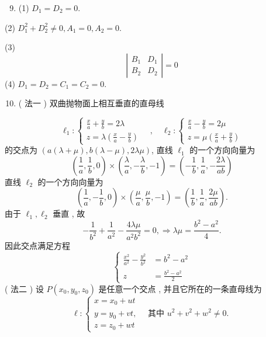 \documentclass[10pt]{article}
\begin{document}
\begin{enumerate}
  \setcounter{enumi}{8}
  \item (1) $D_{1}=D_{2}=0$.
\end{enumerate}
(2) $D_{1}^{2}+D_{2}^{2} \neq 0, A_{1}=0, A_{2}=0$.

(3)
$$
\left|\begin{array}{cc}
B_{1} & D_{1} \\
B_{2} & D_{2}
\end{array}\right|=0
$$
(4) $D_{1}=D_{2}=C_{1}=C_{2}=0$.

\begin{enumerate}
  \setcounter{enumi}{9}
  \item ( 法一 )  双曲抛物面上相互垂直的直母线 
\end{enumerate}
$$
\ell_{1}:\left\{\begin{array}{l}
\frac{x}{a}+\frac{y}{b}=2 \lambda \\
z=\lambda\left(\frac{x}{a}-\frac{y}{b}\right)
\end{array} \quad, \quad \ell_{2}:\left\{\begin{array}{l}
\frac{x}{a}-\frac{y}{b}=2 \mu \\
z=\mu\left(\frac{x}{a}+\frac{y}{b}\right)
\end{array}\right.\right.
$$
 的交点为  $(a(\lambda+\mu), b(\lambda-\mu), 2 \lambda \mu)$,  直线  $\ell_{1}$  的一个方向向量为 
$$
\left(\frac{1}{a}, \frac{1}{b}, 0\right) \times\left(\frac{\lambda}{a},-\frac{\lambda}{b},-1\right)=\left(-\frac{1}{b}, \frac{1}{a},-\frac{2 \lambda}{a b}\right)
$$
 直线  $\ell_{2}$  的一个方向向量为 
$$
\left(\frac{1}{a},-\frac{1}{b}, 0\right) \times\left(\frac{\mu}{a}, \frac{\mu}{b},-1\right)=\left(\frac{1}{b}, \frac{1}{a}, \frac{2 \mu}{a b}\right) .
$$
 由于  $\ell_{1}, \ell_{2}$  垂直 ,  故 
$$
-\frac{1}{b^{2}}+\frac{1}{a^{2}}-\frac{4 \lambda \mu}{a^{2} b^{2}}=0, \Longrightarrow \lambda \mu=\frac{b^{2}-a^{2}}{4} .
$$
 因此交点满足方程 
$$
\left\{\begin{aligned}
\frac{x^{2}}{a^{2}}-\frac{y^{2}}{b^{2}} &=b^{2}-a^{2} \\
z &=\frac{b^{2}-a^{2}}{2}
\end{aligned}\right.
$$
( 法二 )  设  $P\left(x_{0}, y_{0}, z_{0}\right)$  是任意一个交点 ,  并且它所在的一条直母线为 
$$
\ell:\left\{\begin{array}{l}
x=x_{0}+u t \\
y=y_{0}+v t, \quad \text { 其中 } u^{2}+v^{2}+w^{2} \neq 0 . \\
z=z_{0}+w t
\end{array}\right.
$$
\end{document}
